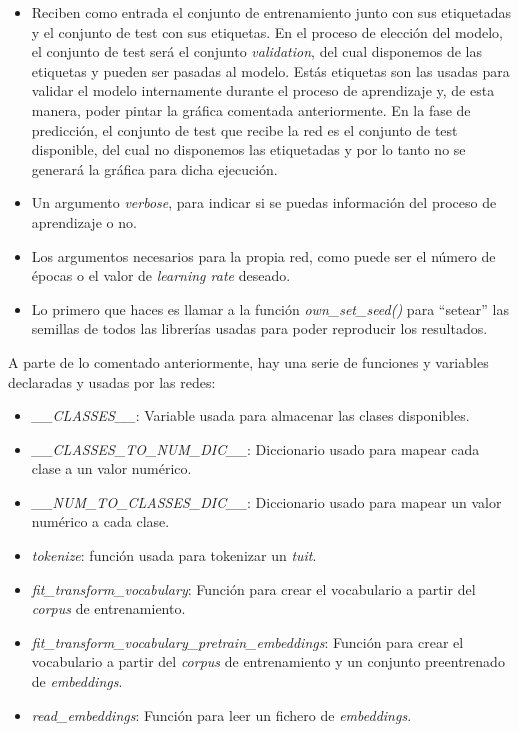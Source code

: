\documentclass[11pt]{article}
\begin{document}
\begin{itemize}
    \item Reciben como entrada el conjunto de entrenamiento junto con sus etiquetadas y el conjunto de test con sus etiquetas. En el proceso de elección del modelo, el conjunto de test será el conjunto \textit{validation}, del cual disponemos de las etiquetas y pueden ser pasadas al modelo. Estás etiquetas son las usadas para validar el modelo internamente durante el proceso de aprendizaje y, de esta manera, poder pintar la gráfica comentada anteriormente. En la fase de predicción, el conjunto de test que recibe la red es el conjunto de test disponible, del cual no disponemos las etiquetadas y por lo tanto no se generará la gráfica para dicha ejecución.
    \item Un argumento \textit{verbose}, para indicar si se puedas información del proceso de aprendizaje o no.
    \item Los argumentos necesarios para la propia red, como puede ser el número de épocas o el valor de \textit{learning rate} deseado.
    \item Lo primero que haces es llamar a la función \textit{own\_set\_seed()} para ``setear'' las semillas de todos las librerías usadas para poder reproducir los resultados.
\end{itemize}

A parte de lo comentado anteriormente, hay una serie de funciones y variables declaradas y usadas por las redes:

\begin{itemize}
    \item \textit{\_\_CLASSES\_\_}: Variable usada para almacenar las clases disponibles.
    \item \textit{\_\_CLASSES\_TO\_NUM\_DIC\_\_}: Diccionario usado para mapear cada clase a un valor numérico.
    \item \textit{\_\_NUM\_TO\_CLASSES\_DIC\_\_}: Diccionario usado para mapear un valor numérico a cada clase.
    \item \textit{tokenize}: función usada para tokenizar un \textit{tuit}.
    \item \textit{fit\_transform\_vocabulary}: Función para crear el vocabulario a partir del \textit{corpus} de entrenamiento.
    \item \textit{fit\_transform\_vocabulary\_pretrain\_embeddings}: Función para crear el vocabulario a partir del \textit{corpus} de entrenamiento y un conjunto preentrenado de \textit{embeddings}.
    \item \textit{read\_embeddings}: Función para leer un fichero de \textit{embeddings}.
\end{itemize}
\end{document}
